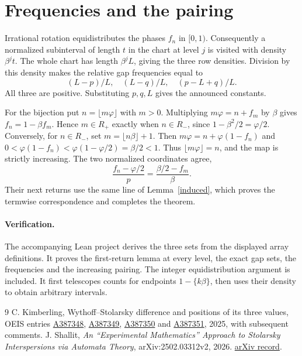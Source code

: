 \documentclass[11pt]{article}
\newcommand{\ph}{\varphi}
\newcommand{\fl}[1]{\lfloor #1\rfloor}
\begin{document}
\section{Frequencies and the pairing}
Irrational rotation equidistributes the phases $f_n$ in $[0,1)$.
Consequently a normalized subinterval of length $t$ in the chart at level
$j$ is visited with density $\beta^j t$. The whole chart has length
$\beta^j L$, giving the three row densities. Division by this density makes
the relative gap frequencies equal to
\[
 (L-p)/L,\quad (L-q)/L,\quad (p-L+q)/L.
\]
All three are positive. Substituting $p,q,L$ gives the announced constants.

For the bijection put $n=\fl{m\ph}$ with $m>0$. Multiplying $m\ph=n+f_m$
by $\beta$ gives $f_n=1-\beta f_m$. Hence $m\in R_+$ exactly when
$n\in R_-$, since $1-\beta^2/2=\ph/2$. Conversely, for $n\in R_-$, set
$m=\fl{n\beta}+1$. Then $m\ph=n+\ph(1-f_n)$ and
$0<\ph(1-f_n)<\ph(1-\ph/2)=\beta/2<1$. Thus $\fl{m\ph}=n$, and
the map is strictly increasing. The two normalized coordinates agree,
\[
 \frac{f_n-\ph/2}{p}=\frac{\beta/2-f_m}{\beta}.
\]
Their next returns use the same line of Lemma~\ref{induced}, which proves the
termwise correspondence and completes the theorem.

\paragraph{Verification.} The accompanying Lean project derives the three
sets from the displayed array definitions. It proves the first-return
lemma at every level, the exact gap sets, the frequencies and the increasing
pairing. The integer equidistribution argument is included. It first
telescopes counts for endpoints $1-\{k\beta\}$, then uses their density
to obtain arbitrary intervals.

\begin{thebibliography}{9}
 C. Kimberling, Wythoff--Stolarsky difference and positions of its
three values, OEIS entries \href{https://oeis.org/A387348}{A387348},
\href{https://oeis.org/A387349}{A387349}, \href{https://oeis.org/A387350}{A387350}
and \href{https://oeis.org/A387351}{A387351}, 2025, with subsequent comments.
 J. Shallit, \emph{An {“Experimental Mathematics”} Approach to Stolarsky Interspersions
via Automata Theory}, arXiv:2502.03312v2, 2026.
\href{https://arxiv.org/abs/2502.03312}{arXiv record}.
\end{thebibliography}
\end{document}
